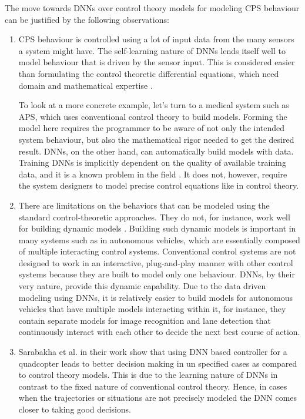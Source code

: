 The move towards DNNs over control theory models for modeling \ac{CPS} behaviour can be justified by the following observations:
 \begin{enumerate}
 	\item CPS behaviour is controlled using a lot of input data from the many sensors a system might have. The self-learning nature of DNNs lends itself well to model behaviour that is driven by the sensor input. This is considered easier than formulating the control theoretic differential equations, which need domain and mathematical expertise \cite{Aamir_2013}.
 	
 	
 	To look at a more concrete example, let's turn to a medical system such as \ac{APS}, which uses conventional control theory to build models. Forming the model here requires the programmer to be aware of not only the intended system behaviour, but also the mathematical rigor needed to get the desired result. DNNs, on the other hand, can automatically build models with data.
 	Training DNNs is implicitly dependent on the quality of available training data, and it is a known problem in the field \cite{jabbar2015methods}. It does not, however, require the system designers to model precise control equations like in control theory.
 	\item  There are limitations on the behaviors that can be modeled using the standard control-theoretic approaches. They do not, for instance, work well for building dynamic models \cite{article23}. Building such dynamic models is important in many systems such as in autonomous vehicles, which are essentially composed of multiple interacting control systems. Conventional control systems are not designed to work in an interactive, plug-and-play manner with other control systems because they are built to model only one behaviour. DNNs, by their very nature,  provide this dynamic capability. 
 	Due to the data driven modeling using DNNs, it is relatively easier to build models for autonomous vehicles that have multiple models interacting within it, for instance, they contain separate models for image recognition and lane detection that continuously interact with each other to decide the next best course of action.

 	\item Sarabakha et al. \cite{sarabakha2019online} in their work show that using \ac{DNN} based controller for a quadcopter leads to better decision making in un specified cases as compared to control theory models.
 	 This is due to the learning nature of \ac{DNN}s in contrast to the fixed nature of conventional control theory. 
 	 Hence, in cases when the trajectories or situations are not precisely modeled the \ac{DNN} comes closer to taking good decisions.
 \end{enumerate}



